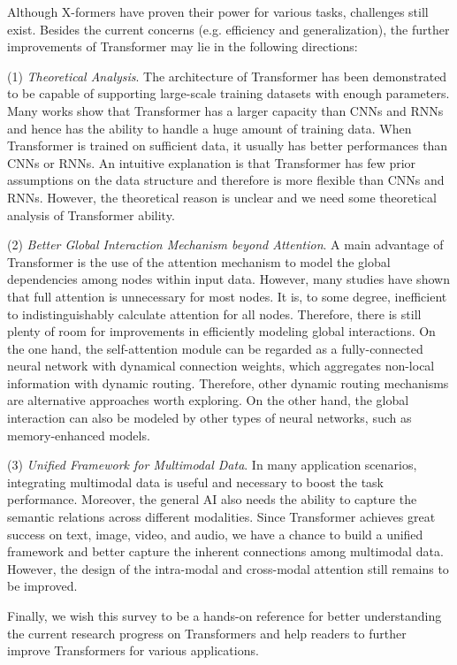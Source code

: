 \documentclass[manuscript,acmsmall,screen,nonacm]{acmart}
\theoremstyle{definition}
\begin{document}
Although X-formers have proven their power for various tasks, challenges still exist. Besides the current concerns (e.g. efficiency and generalization), the further improvements of Transformer may lie in the following directions:

(1) \textit{Theoretical Analysis}. The architecture of Transformer has been demonstrated to be capable of supporting large-scale training datasets with enough parameters. Many works show that Transformer has a larger capacity than CNNs and RNNs and hence has the ability to handle a huge amount of training data.
When Transformer is trained on sufficient data,  it usually has better performances than CNNs or RNNs.
An intuitive explanation is that Transformer has few prior assumptions on the data structure and therefore is more flexible than CNNs and RNNs. However, the theoretical reason is unclear and we need some theoretical analysis of Transformer ability.

(2) \textit{Better Global Interaction Mechanism beyond Attention}. A main advantage of Transformer is the use of the attention mechanism to model the global dependencies among nodes within input data. However, many studies have shown that full attention is unnecessary for most nodes. It is, to some degree, inefficient to indistinguishably calculate attention for all nodes. Therefore, there is still plenty of room for improvements in efficiently modeling global interactions. On the one hand, the self-attention module can be regarded as a fully-connected neural network with dynamical connection weights, which aggregates non-local information with dynamic routing. Therefore, other dynamic routing mechanisms are alternative approaches worth exploring. On the other hand, the global interaction can also be modeled by other types of neural networks, such as memory-enhanced models.

(3) \textit{Unified Framework for Multimodal Data}. In many application scenarios, integrating multimodal data is useful and necessary to boost the task performance. Moreover, the general AI also needs the ability to capture the semantic relations across different modalities.
Since Transformer achieves great success on text, image, video, and audio, we have a chance to build a unified framework and better capture the inherent connections among multimodal data. However, the design of the intra-modal and cross-modal attention still remains to be improved.


Finally, we wish this survey to be a hands-on reference for better understanding the current research progress on Transformers and help readers to further improve Transformers for various applications.




\end{document}
